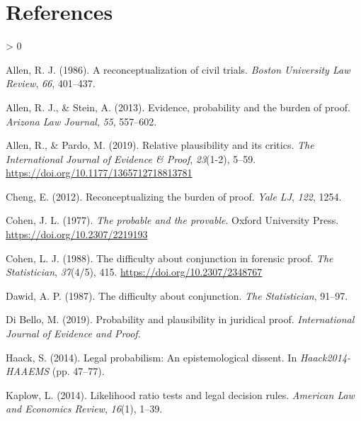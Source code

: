 \documentclass[
  10pt,
  dvipsnames,enabledeprecatedfontcommands]{scrartcl}
\newlength{\cslhangindent}
\newenvironment{CSLReferences}[2] %
 {%
  \setlength{\parindent}{0pt}
  \ifodd #1 \everypar{\setlength{\hangindent}{\cslhangindent}}\ignorespaces\fi
  \ifnum #2 > 0
  \setlength{\parskip}{#2\baselineskip}
  \fi
 }%
 {}
\begin{document}
\hypertarget{references}{%
\section*{References}\label{references}}

\hypertarget{refs}{}
\begin{CSLReferences}{1}{0}
\leavevmode\hypertarget{ref-Allen1986A-Reconceptuali}{}%
Allen, R. J. (1986). A reconceptualization of civil trials. \emph{Boston
University Law Review}, \emph{66}, 401--437.

\leavevmode\hypertarget{ref-allen2013}{}%
Allen, R. J., \& Stein, A. (2013). Evidence, probability and the burden
of proof. \emph{Arizona Law Journal}, \emph{55}, 557--602.

\leavevmode\hypertarget{ref-AllenPardo2019relative}{}%
Allen, R., \& Pardo, M. (2019). Relative plausibility and its critics.
\emph{The International Journal of Evidence {\&} Proof}, \emph{23}(1-2),
5--59. \url{https://doi.org/10.1177/1365712718813781}

\leavevmode\hypertarget{ref-cheng2012reconceptualizing}{}%
Cheng, E. (2012). Reconceptualizing the burden of proof. \emph{Yale LJ},
\emph{122}, 1254.

\leavevmode\hypertarget{ref-Cohen1977The-probable-an}{}%
Cohen, J. L. (1977). \emph{The probable and the provable}. Oxford
University Press. \url{https://doi.org/10.2307/2219193}

\leavevmode\hypertarget{ref-cohen1988difficulty}{}%
Cohen, L. J. (1988). The difficulty about conjunction in forensic proof.
\emph{The Statistician}, \emph{37}(4/5), 415.
\url{https://doi.org/10.2307/2348767}

\leavevmode\hypertarget{ref-dawid1987difficulty}{}%
Dawid, A. P. (1987). The difficulty about conjunction. \emph{The
Statistician}, 91--97.

\leavevmode\hypertarget{ref-DiBello2019plausibility}{}%
Di Bello, M. (2019). Probability and plausibility in juridical proof.
\emph{International Journal of Evidence and Proof}.

\leavevmode\hypertarget{ref-haack2011legal}{}%
Haack, S. (2014). Legal probabilism: An epistemological dissent. In
\emph{{Haack2014-HAAEMS}} (pp. 47--77).

\leavevmode\hypertarget{ref-kaplow2014likelihood}{}%
Kaplow, L. (2014). Likelihood ratio tests and legal decision rules.
\emph{American Law and Economics Review}, \emph{16}(1), 1--39.


\end{CSLReferences}
\end{document}
